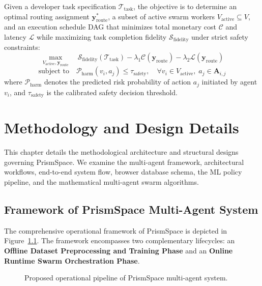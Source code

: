 \documentclass[12pt,a4paper]{report}
\begin{document}
Given a developer task specification $\mathcal{T}_{\text{task}}$, the objective is to determine an optimal routing assignment $\mathbf{y}_{\text{route}}^*$, a subset of active swarm workers $V_{\text{active}} \subseteq V$, and an execution schedule DAG that minimizes total monetary cost $\mathcal{C}$ and latency $\mathcal{L}$ while maximizing task completion fidelity $\mathcal{S}_{\text{fidelity}}$ under strict safety constraints:
\begin{equation}
    \max_{V_{\text{active}}, \mathbf{y}_{\text{route}}} \quad \mathcal{S}_{\text{fidelity}}(\mathcal{T}_{\text{task}}) - \lambda_1 \mathcal{C}(\mathbf{y}_{\text{route}}) - \lambda_2 \mathcal{L}(\mathbf{y}_{\text{route}})
\end{equation}
\begin{equation}
    \text{subject to} \quad \mathcal{P}_{\text{harm}}(v_i, a_j) \le \tau_{\text{safety}}, \quad \forall v_i \in V_{\text{active}}, \; a_j \in \mathbf{A}_{i,j}
\end{equation}
where $\mathcal{P}_{\text{harm}}$ denotes the predicted risk probability of action $a_j$ initiated by agent $v_i$, and $\tau_{\text{safety}}$ is the calibrated safety decision threshold.


\chapter{Methodology and Design Details}

This chapter details the methodological architecture and structural designs governing PrismSpace. We examine the multi-agent framework, architectural workflows, end-to-end system flow, browser database schema, the ML policy pipeline, and the mathematical multi-agent swarm algorithms.

\section{Framework of PrismSpace Multi-Agent System}
The comprehensive operational framework of PrismSpace is depicted in Figure~\ref{fig:framework}. The framework encompasses two complementary lifecycles: an \textbf{Offline Dataset Preprocessing and Training Phase} and an \textbf{Online Runtime Swarm Orchestration Phase}.

\begin{figure}[H]
    \centering
    \caption{Proposed operational pipeline of PrismSpace multi-agent system.}
    \label{fig:framework}
\end{figure}
\end{document}
